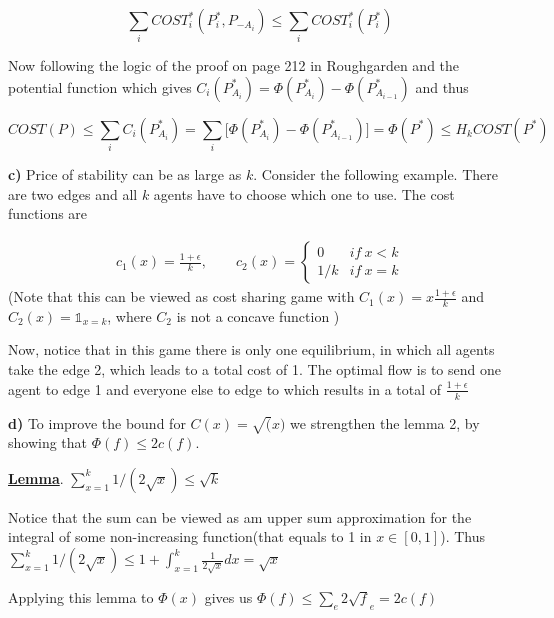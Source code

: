 $$
\sum_i COST_i^*(P^*_i, P_{-A_i}) \le \sum_i COST_i^*(P^*_i) 
$$

Now following the logic of the proof on page 212 in Roughgarden and the potential function which gives $C_i(P^*_{A_i}) = \Phi(P^*_{A_i}) - \Phi(P^*_{A_{i-1}})$ and thus

$$
COST(P) \le \sum_i C_i(P^*_{A_i}) = \sum_i \big[ \Phi(P^*_{A_i}) - \Phi(P^*_{A_{i-1}}) \big] = \Phi(P^*) \le H_k COST(P^*)
$$



\textbf{c)} Price of stability can be as large as $k$. Consider the following example. There are two edges and all $k$ agents have to choose which one to use. The cost functions are

\begin{align*}
c_1(x) = \frac{1+\epsilon}{k},\qquad c_2(x) = \begin{cases}0\quad &if\ x<k\\ 1/k & if\ x=k \end{cases}
\end{align*}
(Note that this can be viewed as cost sharing game with $C_1(x)=x \frac{1+\epsilon}{k}$ and $C_2(x)= \mathbb{1}_{x=k}$, where $C_2$ is not a concave function )

Now, notice that in this game there is only one equilibrium, in which all agents take the edge 2, which leads to a total cost of 1. The optimal flow is to send one agent to edge 1 and everyone else to edge to which results in a total of $\frac{1+\epsilon}{k}$

\textbf{d)} To improve the bound for $C(x)=\sqrt(x)$ we strengthen the lemma 2, by showing that $\Phi(f)\leq 2 c(f)$. 

\uline{\textbf{Lemma}}. $\sum_{x=1}^k 1/(2\sqrt x)\leq \sqrt k$

Notice that the sum can be viewed as am upper sum approximation for the integral of some non-increasing function(that equals to 1 in $x\in [0,1]$). Thus $\sum_{x=1}^k 1/(2\sqrt x)\leq 1+ \int_{x=1}^k \frac{1}{2\sqrt x}dx = \sqrt x$

Applying this lemma to $\Phi(x)$ gives us $\Phi(f)\leq \sum_e 2\sqrt f_e = 2 c(f)$
